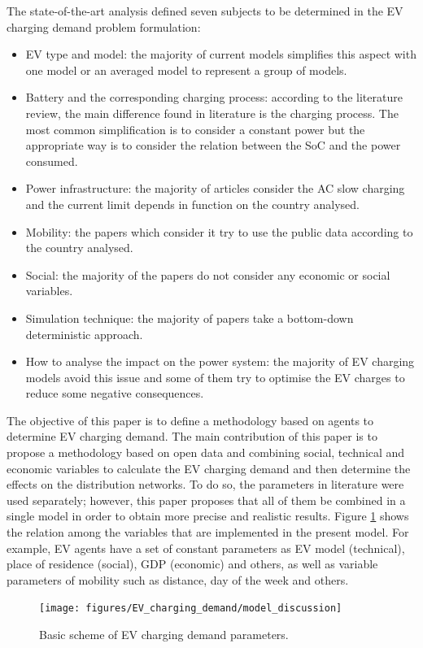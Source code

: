 \documentclass[a4paper,11pt,twoside,openright]{report}
\begin{document}
The state-of-the-art analysis defined seven subjects to be determined in the EV charging demand problem formulation:
\begin{itemize}
	\item EV type and model: the majority of current models simplifies this aspect with one model or an averaged model to represent a group of models. 
	\item Battery and the corresponding charging process: according to the literature review, the main difference found in literature is the charging process. The most common simplification is to consider a constant power but the appropriate way is to consider the relation between the SoC and the power consumed.
	\item Power infrastructure: the majority of articles consider the AC slow charging and the current limit depends in function on the country analysed.
	\item Mobility: the papers which consider it try to use the public data according to the country analysed.
	\item Social: the majority of the papers do not consider any economic or social variables.
	\item Simulation technique: the majority of papers take a bottom-down deterministic approach.
	\item How to analyse the impact on the power system: the majority of EV charging models avoid this issue and some of them try to optimise the EV charges to reduce some negative consequences.
\end{itemize}


The objective of this paper is to define a methodology based on agents to determine EV charging demand. The main contribution of this paper is to propose a methodology based on open data and combining social, technical and economic variables to calculate the EV charging demand and then determine the effects on the distribution networks. To do so, the parameters in literature were used separately; however, this paper proposes that all of them be combined in a single model in order to obtain more precise and realistic results. Figure \ref{fig:1st_scheme} shows the relation among the variables that are implemented in the present model. For example, EV agents have a set of constant parameters as EV model (technical), place of residence (social), GDP (economic) and others, as well as variable parameters of mobility such as distance, day of the week and others.

\begin{figure}[htbp]
	\centering
	\texttt{[image: figures/EV\_charging\_demand/model\_discussion]}
	\caption{Basic scheme of EV charging demand parameters.}
	\label{fig:1st_scheme}
\end{figure}
\end{document}
